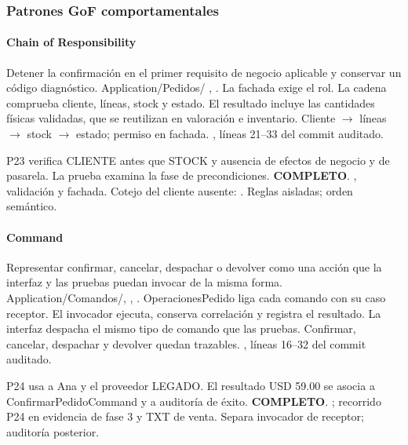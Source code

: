 \subsubsection{Patrones GoF comportamentales}
\paragraph{Chain of Responsibility}
 Detener la confirmación en el primer requisito de negocio aplicable y conservar un código diagnóstico.
 Application/Pedidos/ , . La fachada exige el rol. La cadena comprueba cliente, líneas, stock y estado. El resultado incluye las cantidades físicas validadas, que se reutilizan en valoración e inventario.
 Cliente $\to$ líneas $\to$ stock $\to$ estado; permiso en fachada.
 , líneas 21--33 del commit auditado.

 P23 verifica CLIENTE antes que STOCK y ausencia de efectos de negocio y de pasarela. La prueba examina la fase de precondiciones. \textbf{COMPLETO}.
 , validación y fachada. Cotejo del cliente ausente: .
 Reglas aisladas; orden semántico.
\medskip
\clearpage
\paragraph{Command}
 Representar confirmar, cancelar, despachar o devolver como una acción que la interfaz y las pruebas puedan invocar de la misma forma.
 Application/Comandos/, , . OperacionesPedido liga cada comando con su caso receptor. El invocador ejecuta, conserva correlación y registra el resultado. La interfaz despacha el mismo tipo de comando que las pruebas.
 Confirmar, cancelar, despachar y devolver quedan trazables.
 , líneas 16--32 del commit auditado.

 P24 usa a Ana y el proveedor LEGADO. El resultado USD 59.00 se asocia a ConfirmarPedidoCommand y a auditoría de éxito. \textbf{COMPLETO}.
 ; recorrido P24 en evidencia de fase 3 y TXT de venta.
 Separa invocador de receptor; auditoría posterior.
\medskip
\clearpage
